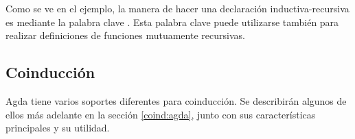
Como se ve en el ejemplo, la manera de hacer una declaración inductiva-recursiva es mediante la palabra clave . Esta palabra clave puede utilizarse también para realizar definiciones de funciones mutuamente recursivas. 


\subsection{Coinducción}\label{agda:coinduction}

Agda tiene varios soportes diferentes para coinducción. Se describirán algunos de ellos más adelante en la sección \ref{coind:agda}, junto con sus características principales y su utilidad.